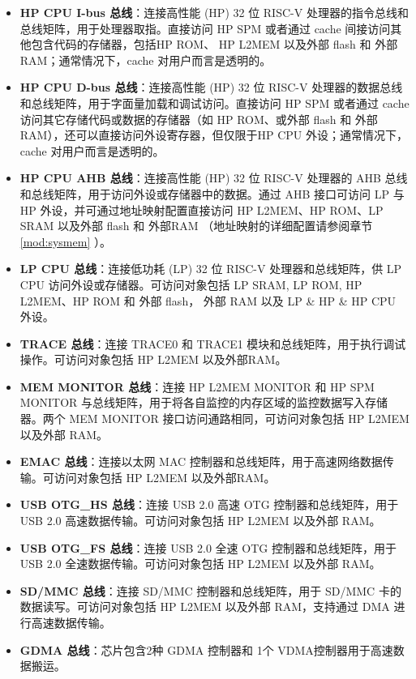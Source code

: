 \documentclass[main\_\_CN.tex]{subfiles}
\begin{document}
\begin{itemize}
    \item \textbf{HP CPU I-bus 总线}：连接高性能 (HP) 32 位 RISC-V 处理器的指令总线和总线矩阵，用于处理器取指。直接访问 HP SPM 或者通过 cache 间接访问其他包含代码的存储器，包括HP ROM、 HP L2MEM 以及外部 flash 和 外部RAM；通常情况下，cache 对用户而言是透明的。
    \item \textbf{HP CPU D-bus 总线}：连接高性能 (HP) 32 位 RISC-V 处理器的数据总线和总线矩阵，用于字面量加载和调试访问。直接访问 HP SPM 或者通过 cache 访问其它存储代码或数据的存储器（如 HP ROM、或外部 flash 和 外部RAM），还可以直接访问外设寄存器，但仅限于HP CPU 外设；通常情况下，cache 对用户而言是透明的。
    \item \textbf{HP CPU AHB 总线}：连接高性能 (HP) 32 位 RISC-V 处理器的 AHB 总线和总线矩阵，用于访问外设或存储器中的数据。通过 AHB 接口可访问 LP 与 HP 外设，并可通过地址映射配置直接访问 HP L2MEM、HP ROM、LP SRAM 以及外部 flash 和 外部RAM （地址映射的详细配置请参阅章节 \ref{mod:sysmem} \textit{}）。
    \item \textbf{LP CPU 总线}：连接低功耗 (LP) 32 位 RISC-V 处理器和总线矩阵，供 LP CPU 访问外设或存储器。可访问对象包括 LP SRAM, LP ROM, HP L2MEM、HP ROM 和 外部 flash， 外部 RAM 以及 LP \& HP \& HP CPU 外设。
    \item \textbf{TRACE 总线}：连接 TRACE0 和 TRACE1 模块和总线矩阵，用于执行调试操作。可访问对象包括 HP L2MEM 以及外部RAM。
    \item \textbf{MEM MONITOR 总线}：连接 HP L2MEM MONITOR 和 HP SPM MONITOR 与总线矩阵，用于将各自监控的内存区域的监控数据写入存储器。两个 MEM MONITOR 接口访问通路相同，可访问对象包括 HP L2MEM 以及外部 RAM。
    \item \textbf{EMAC 总线}：连接以太网 MAC 控制器和总线矩阵，用于高速网络数据传输。可访问对象包括 HP L2MEM 以及外部RAM。
    \item \textbf{USB OTG\_HS 总线}：连接 USB 2.0 高速 OTG 控制器和总线矩阵，用于 USB 2.0 高速数据传输。可访问对象包括 HP L2MEM 以及外部 RAM。
    \item \textbf{USB OTG\_FS 总线}：连接 USB 2.0 全速 OTG 控制器和总线矩阵，用于 USB 2.0 全速数据传输。可访问对象包括 HP L2MEM 以及外部 RAM。
    \item \textbf{SD/MMC 总线}：连接 SD/MMC 控制器和总线矩阵，用于 SD/MMC 卡的数据读写。可访问对象包括 HP L2MEM 以及外部 RAM，支持通过 DMA 进行高速数据传输。
    \item \textbf{GDMA 总线}：芯片包含2种 GDMA 控制器和 1个 VDMA控制器用于高速数据搬运。
        \begin{itemize}

\end{itemize}
\end{itemize}
\end{document}

